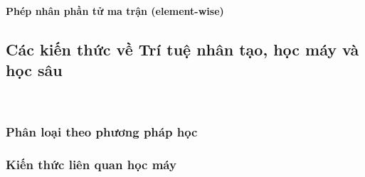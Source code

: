 

\textbf{Phép nhân phần tử  ma trận (element-wise)}







\subsection{Các kiến thức về  Trí tuệ nhân tạo, học máy và học sâu}\

\subsubsection{Phân loại theo phương pháp học}

\subsubsection{Kiến thức liên quan học máy}
